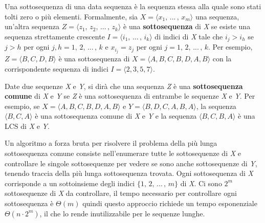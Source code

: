 \documentclass[10pt, a4paper]{report}
\begin{document}
Una sottosequenza di una data sequenza è la sequenza stessa alla quale sono stati tolti zero o più elementi. Formalmente, sia $X = \langle x_1,\,...\,,\,x_m \rangle$ una sequenza, un'altra sequenza $Z = \langle z_1,\,z_2,\,...\,,\,z_k\rangle$  è una \textbf{sottosequenza} di \textit{X} se esiste una sequenza strettamente crescente $I = \langle i_1,\,...\,,\,i_k\rangle$ di indici di \textit{X} tale che $i_j > i_h$ se $j > h$ per ogni $j,h = 1,\,2,\,...\,,\,k$ e $x_{i_{j}} = z_j$ per ogni $j = 1,\,2,\,...\,,\,k$. Per esempio, $Z = \langle B, C, D, B\rangle$ è una sottosequenza di $X = \langle A, B, C, B, D, A, B\rangle$ con la corrispondente sequenza di indici $I = \langle 2, 3, 5, 7\rangle$.

Date due sequenze \textit{X} e \textit{Y}, si dirà che una sequenza \textit{Z} è una \textbf{sottosequenza comune} di \textit{X} e \textit{Y} se \textit{Z} è una sottosequenza di entrambe le sequenze \textit{X} e \textit{Y}. Per esempio, se $X = \langle A, B, C, B, D, A, B\rangle$ e $Y = \langle B, D, C, A, B, A\rangle$, la sequenza $\langle B, C, A\rangle$ è una sottosequenza comune di \textit{X} e \textit{Y} e la sequenza $\langle B, C, B, A\rangle$ è una LCS di \textit{X} e \textit{Y}.

Un algoritmo a forza bruta per risolvere il problema della più lunga sottosequenza comune consiste nell'enumerare tutte le sottosequenze di \textit{X} e controllare le singole sottosequenze per vedere se sono anche sottosequenze di \textit{Y}, tenendo traccia della più lunga sottosequenza trovata. Ogni sottosequenza di \textit{X} corrisponde a un sottoinsieme degli indici $\{1,\,2,\,...\,,\,m\}$ di \textit{X}. Ci sono $2^m$ sottosequenze di \textit{X} da controllare, il tempo necessario per controllare ogni sottosequenza è $\Theta(m)$ quindi questo approccio richiede un tempo esponenziale $\Theta(n\cdot2^m)$, il che lo rende inutilizzabile per le sequenze lunghe.
\end{document}
